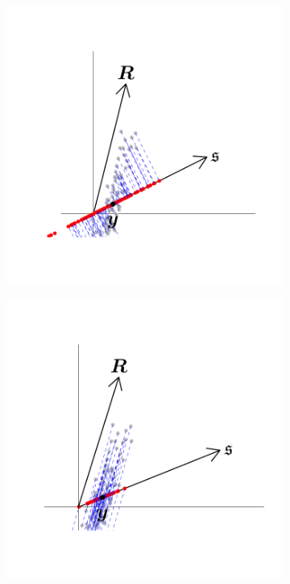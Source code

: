 \documentclass[12pt]{article}
\theoremstyle{definition}
\theoremstyle{property}
\begin{document}
\begin{figure}
		\vspace{1cm}
		
		\begin{subfigure}[t]{0.45\textwidth}
			\centering
			\includegraphics[width=\linewidth]{Figs/OrthProj.pdf}
		\end{subfigure}
		\hfill
		\begin{subfigure}[t]{0.5\textwidth}
			\centering
			\includegraphics[width=\linewidth]{Figs/ObliqProj.pdf}
		\end{subfigure}
		

\end{figure}
\end{document}
